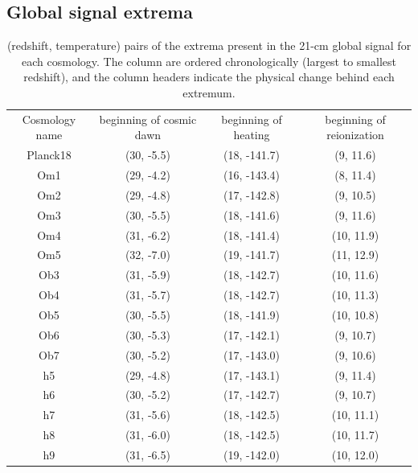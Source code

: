 \documentclass[floats,floatfix,showpacs,amssymb,prd,superscriptaddress,nofootinbib]{revtex4-2} %
\begin{document}

\nocite{*}


\begin{appendices}
\section{Global signal extrema}
\begin{table}[H]
    \centering
    \begin{tabular}{c c c c}
        \hline
        Cosmology name & beginning of cosmic dawn & beginning of heating & beginning of reionization \\ 
        \hhline{= = = =}
        Planck18 & (30, -5.5) & (18, -141.7) & (9, 11.6) \\ \hline
        Om1 & (29, -4.2) & (16, -143.4) & (8, 11.4) \\
        Om2 & (29, -4.8) & (17, -142.8) & (9, 10.5) \\
        Om3 & (30, -5.5) & (18, -141.6) & (9, 11.6) \\
        Om4 & (31, -6.2) & (18, -141.4) & (10, 11.9) \\
        Om5 & (32, -7.0) & (19, -141.7) & (11, 12.9) \\ \hline
        Ob3 & (31, -5.9) & (18, -142.7) & (10, 11.6) \\
        Ob4 & (31, -5.7) & (18, -142.7) & (10, 11.3) \\
        Ob5 & (30, -5.5) & (18, -141.9) & (10, 10.8) \\
        Ob6 & (30, -5.3) & (17, -142.1) & (9, 10.7) \\
        Ob7 & (30, -5.2) & (17, -143.0) & (9, 10.6) \\ \hline
        h5 & (29, -4.8) & (17, -143.1) & (9, 11.4) \\
        h6 & (30, -5.2) & (17, -142.7) & (9, 10.7) \\
        h7 & (31, -5.6) & (18, -142.5) & (10, 11.1) \\
        h8 & (31, -6.0) & (18, -142.5) & (10, 11.7) \\
        h9 & (31, -6.5) & (19, -142.0) & (10, 12.0) \\ \hline
    \end{tabular}
    \caption{(redshift, temperature) pairs of the extrema present in the 21-cm global signal for each cosmology. The column are ordered chronologically (largest to smallest redshift), and the column headers indicate the physical change behind each extremum.}
    \label{tab:global_signal_extrema}
\end{table}

\end{appendices}
\end{document}
